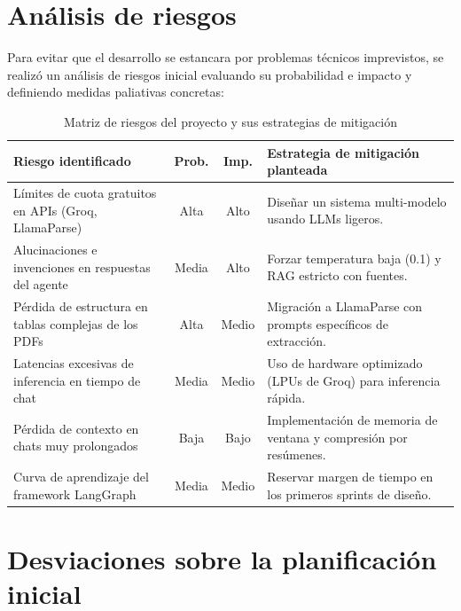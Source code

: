 \documentclass[12pt,a4paper,oneside]{report}
\begin{document}
\section{Análisis de riesgos}

Para evitar que el desarrollo se estancara por problemas técnicos imprevistos, se realizó un análisis de riesgos inicial evaluando su probabilidad e impacto y definiendo medidas paliativas concretas:

\begin{table}[H]
    \centering
    \caption{Matriz de riesgos del proyecto y sus estrategias de mitigación}
    \begin{tabular}{@{}p{4.5cm}ccp{5.5cm}@{}}
        \toprule
        \textbf{Riesgo identificado}                          & \textbf{Prob.} & \textbf{Imp.} & \textbf{Estrategia de mitigación planteada}                     \\
        \midrule
        Límites de cuota gratuitos en APIs (Groq, LlamaParse)  & Alta           & Alto          & Diseñar un sistema multi-modelo usando LLMs ligeros.            \\
        Alucinaciones e invenciones en respuestas del agente   & Media          & Alto          & Forzar temperatura baja (0.1) y RAG estricto con fuentes.       \\
        Pérdida de estructura en tablas complejas de los PDFs  & Alta           & Medio         & Migración a LlamaParse con prompts específicos de extracción.   \\
        Latencias excesivas de inferencia en tiempo de chat    & Media          & Medio         & Uso de hardware optimizado (LPUs de Groq) para inferencia rápida.\\
        Pérdida de contexto en chats muy prolongados           & Baja           & Bajo          & Implementación de memoria de ventana y compresión por resúmenes. \\
        Curva de aprendizaje del framework LangGraph           & Media          & Medio         & Reservar margen de tiempo en los primeros sprints de diseño.    \\
        \bottomrule
    \end{tabular}
    \label{tab:riesgos}
\end{table}

\section{Desviaciones sobre la planificación inicial}
\end{document}
